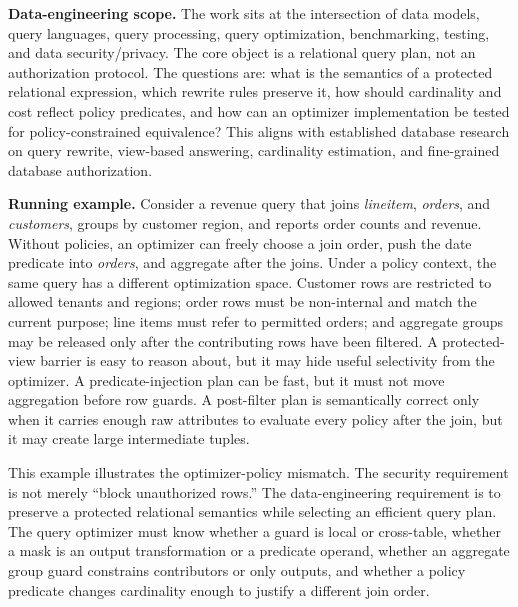 \documentclass[conference]{IEEEtran}
\begin{document}
\noindent\textbf{Data-engineering scope.}
The work sits at the intersection of data models, query languages, query processing, query optimization, benchmarking, testing, and data security/privacy. The core object is a relational query plan, not an authorization protocol. The questions are: what is the semantics of a protected relational expression, which rewrite rules preserve it, how should cardinality and cost reflect policy predicates, and how can an optimizer implementation be tested for policy-constrained equivalence? This aligns with established database research on query rewrite\cite{levy1994predicate,chaudhuri1995views,goldstein2001views}, view-based answering\cite{levy1995views,halevy2001views,pottinger2001minicon}, cardinality estimation\cite{leis2015job,dutt2019selectivity,kipf2019learnedcards}, and fine-grained database authorization\cite{rizvi2004fgac,kabra2006redundancy,chaudhuri2007predicated}.

\noindent\textbf{Running example.}
Consider a revenue query that joins \textit{lineitem}, \textit{orders}, and \textit{customers}, groups by customer region, and reports order counts and revenue. Without policies, an optimizer can freely choose a join order, push the date predicate into \textit{orders}, and aggregate after the joins. Under a policy context, the same query has a different optimization space. Customer rows are restricted to allowed tenants and regions; order rows must be non-internal and match the current purpose; line items must refer to permitted orders; and aggregate groups may be released only after the contributing rows have been filtered. A protected-view barrier is easy to reason about, but it may hide useful selectivity from the optimizer. A predicate-injection plan can be fast, but it must not move aggregation before row guards. A post-filter plan is semantically correct only when it carries enough raw attributes to evaluate every policy after the join, but it may create large intermediate tuples.

This example illustrates the optimizer-policy mismatch. The security requirement is not merely ``block unauthorized rows.'' The data-engineering requirement is to preserve a protected relational semantics while selecting an efficient query plan. The query optimizer must know whether a guard is local or cross-table, whether a mask is an output transformation or a predicate operand, whether an aggregate group guard constrains contributors or only outputs, and whether a policy predicate changes cardinality enough to justify a different join order.
\end{document}
